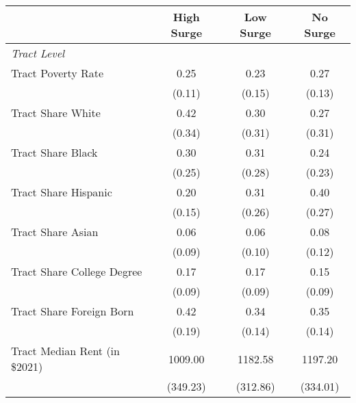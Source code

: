 \begin{tabular}{l*{3}{c}}
\toprule
                &High Surge&Low Surge& No Surge\\
\midrule
\emph{Tract Level}&         &         &         \\
\addlinespace
Tract Poverty Rate &     0.25&     0.23&     0.27\\
                &   (0.11)&   (0.15)&   (0.13)\\
\addlinespace
Tract Share White  &     0.42&     0.30&     0.27\\
                &   (0.34)&   (0.31)&   (0.31)\\
\addlinespace
Tract Share Black  &     0.30&     0.31&     0.24\\
                &   (0.25)&   (0.28)&   (0.23)\\
\addlinespace
Tract Share Hispanic&     0.20&     0.31&     0.40\\
                &   (0.15)&   (0.26)&   (0.27)\\
\addlinespace
Tract Share Asian  &     0.06&     0.06&     0.08\\
                &   (0.09)&   (0.10)&   (0.12)\\
\addlinespace
Tract Share College Degree&     0.17&     0.17&     0.15\\
                &   (0.09)&   (0.09)&   (0.09)\\
\addlinespace
Tract Share Foreign Born&     0.42&     0.34&     0.35\\
                &   (0.19)&   (0.14)&   (0.14)\\
\addlinespace
Tract Median Rent (in \$2021)&  1009.00&  1182.58&  1197.20\\
                & (349.23)& (312.86)& (334.01)\\
\bottomrule
\end{tabular}
